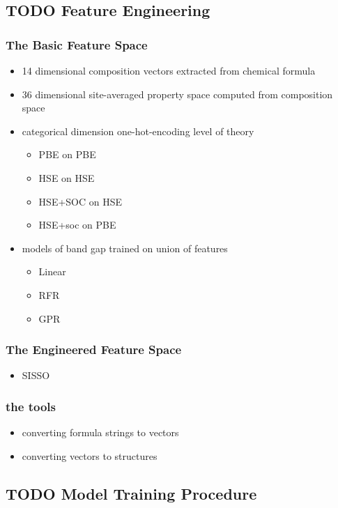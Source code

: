 \documentclass[aip, jmp, amsmath, amssymb]{revtex4-2}
\begin{document}
\subsection*{{\bfseries\sffamily TODO} Feature Engineering}
\label{sec:orgdace41d}
\subsubsection*{The Basic Feature Space}
\label{sec:org40cf0ba}
\begin{itemize}
\item 14 dimensional composition vectors extracted from chemical formula
\item 36 dimensional site-averaged property space computed from composition space
\item categorical dimension one-hot-encoding level of theory
\begin{itemize}
\item PBE on PBE
\item HSE on HSE
\item HSE+SOC on HSE
\item HSE+soc on PBE
\end{itemize}
\item models of band gap trained on union of features
\begin{itemize}
\item Linear
\item RFR
\item GPR
\end{itemize}
\end{itemize}

\subsubsection*{The Engineered Feature Space}
\label{sec:org518c1af}
\begin{itemize}
\item SISSO
\end{itemize}
\subsubsection*{the tools}
\label{sec:org21685f7}
\begin{itemize}
\item converting formula strings to vectors
\item converting vectors to structures
\end{itemize}

\subsection*{{\bfseries\sffamily TODO} Model Training Procedure}
\label{sec:org5697ba6}
\end{document}
